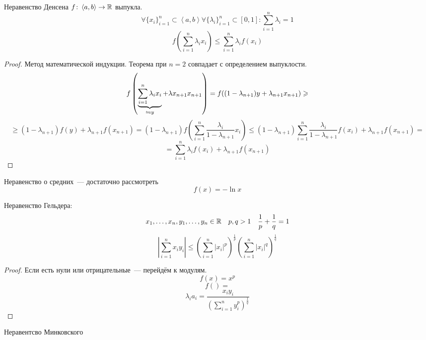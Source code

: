 \begin{theorem}{Неравенство Денсена}
$f\colon \left<a, b\right> \rightarrow \mathbb{R}$ выпукла.
$$\forall \{x_i\}_{i=1}^n \subset \left<a, b\right> \forall \{\lambda_i\}_{i=1}^n \subset [0, 1]\colon \sum_{i=1}^n \lambda_i = 1$$
$$f\left(\sum_{i=1}^n \lambda_i x_i\right) \leqslant \sum_{i=1}^n \lambda_i f(x_i)$$ 
\end{theorem}
\begin{proof}
Метод математической индукции. Теорема при $n = 2$ совпадает с определением выпуклости.
$$f\left(\underbrace{\sum_{i=1}^n \lambda_i x_i}_{\leftrightharpoons y} + \lambda x_{n+1} x_{n+1}\right) = f((1 - \lambda_{n+1})y + \lambda_{n+1} x_{n+1}) \geqslant $$
$$ \geqslant (1-\lambda_{n+1}) f(y) + \lambda_{n+1} f(x_{n+1}) = (1 - \lambda_{n+1}) f\left(\sum_{i=1}^n \frac{\lambda_i}{1 - \lambda_{n+1}} x_i\right) \leqslant (1 - \lambda_{n+1}) \sum_{i=1}^n \frac{\lambda_i}{1-\lambda_{n+1}} f(x_i) + \lambda_{n+1} f(x_{n+1}) = $$
$$= \sum_{i=1}^n \lambda_i f(x_i) + \lambda_{n+1} f(x_{n+1})$$
\end{proof}

\begin{conseq}
Неравенство о средних~--- достаточно рассмотреть $$f(x) = -\ln x$$
\end{conseq}
\begin{conseq}
Неравенство Гельдера:
$$x_1, \ldots, x_n, y_1, \ldots, y_n \in \mathbb{R} \quad p,q > 1 \quad \frac1p + \frac1q = 1$$
$$\left|\sum_{i=1}^n x_iy_i\right| \leqslant \left(\sum_{i=1}^n |x_i|^p\right)^{\frac1p} \left(\sum_{i=1}^n |x_i|^q\right)^{\frac1q}$$
\end{conseq}
\begin{proof}
Если есть нули или отрицательные~--- перейдём к модулям.
$$f(x) = x^p$$
$$f\left(  \right) = $$
$$ \lambda_i a_i = \frac{x_iy_i}{(\sum_{i=1}^n y_i^p) ^ {\frac1q}}$$
\end{proof}

\begin{conseq}
Неравентсво Минковского
\end{conseq}